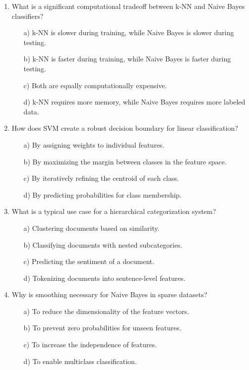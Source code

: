 \documentclass[8pt]{extarticle}
\begin{document}
\begin{multicols}{2}
\begin{enumerate}
\item What is a significant computational tradeoff between k-NN and Naive Bayes classifiers?
\begin{itemize}
\item[a)] k-NN is slower during training, while Naive Bayes is slower during testing.
\item[b)] k-NN is faster during training, while Naive Bayes is faster during testing.
\item[c)] Both are equally computationally expensive.
\item[d)] k-NN requires more memory, while Naive Bayes requires more labeled data.
\end{itemize}


\item How does SVM create a robust decision boundary for linear classification?
\begin{itemize}
\item[a)] By assigning weights to individual features.
\item[b)] By maximizing the margin between classes in the feature space.
\item[c)] By iteratively refining the centroid of each class.
\item[d)] By predicting probabilities for class membership.
\end{itemize}


\item What is a typical use case for a hierarchical categorization system?
\begin{itemize}
\item[a)] Clustering documents based on similarity.
\item[b)] Classifying documents with nested subcategories.
\item[c)] Predicting the sentiment of a document.
\item[d)] Tokenizing documents into sentence-level features.
\end{itemize}


\item Why is smoothing necessary for Naive Bayes in sparse datasets?
\begin{itemize}
\item[a)] To reduce the dimensionality of the feature vectors.
\item[b)] To prevent zero probabilities for unseen features.
\item[c)] To increase the independence of features.
\item[d)] To enable multiclass classification.
\end{itemize}



\end{enumerate}
\end{multicols}
\end{document}
